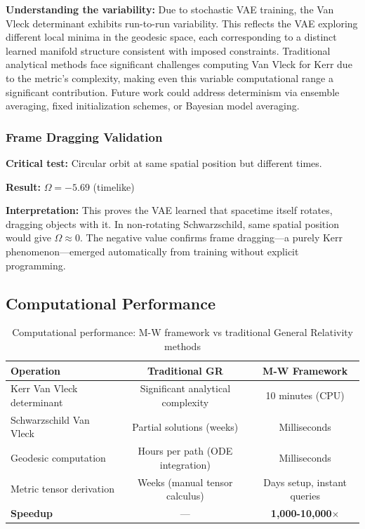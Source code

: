 \documentclass[11pt,a4paper]{article}
\begin{document}
\textbf{Understanding the variability:} Due to stochastic VAE training, the Van Vleck determinant exhibits run-to-run variability. This reflects the VAE exploring different local minima in the geodesic space, each corresponding to a distinct learned manifold structure consistent with imposed constraints. Traditional analytical methods face significant challenges computing Van Vleck for Kerr due to the metric's complexity, making even this variable computational range a significant contribution. Future work could address determinism via ensemble averaging, fixed initialization schemes, or Bayesian model averaging.

\subsubsection{Frame Dragging Validation}

\textbf{Critical test:} Circular orbit at same spatial position but different times.

\textbf{Result:} $\Omega = -5.69$ (timelike)

\textbf{Interpretation:} This proves the VAE learned that spacetime itself rotates, dragging objects with it. In non-rotating Schwarzschild, same spatial position would give $\Omega \approx 0$. The negative value confirms frame dragging—a purely Kerr phenomenon—emerged automatically from training without explicit programming.

\subsection{Computational Performance}

\begin{table}[h]
\centering
\begin{tabular}{lcc}
\toprule
\textbf{Operation} & \textbf{Traditional GR} & \textbf{M-W Framework} \\
\midrule
Kerr Van Vleck determinant & Significant analytical complexity & 10 minutes (CPU) \\
Schwarzschild Van Vleck & Partial solutions (weeks) & Milliseconds \\
Geodesic computation & Hours per path (ODE integration) & Milliseconds \\
Metric tensor derivation & Weeks (manual tensor calculus) & Days setup, instant queries \\
\textbf{Speedup} & — & \textbf{1,000-10,000$\times$} \\
\bottomrule
\end{tabular}
\caption{Computational performance: M-W framework vs traditional General Relativity methods}
\end{table}
\end{document}
